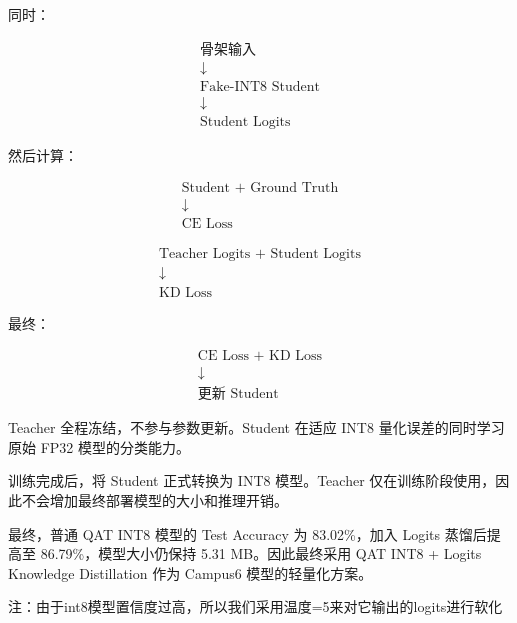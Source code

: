 同时：

\[
\begin{gathered}
\text{骨架输入}\\[-0.2em]
\downarrow\\[-0.2em]
\text{Fake-INT8 Student}\\[-0.2em]
\downarrow\\[-0.2em]
\text{Student Logits}
\end{gathered}
\]

然后计算：

\[
\begin{gathered}
\text{Student + Ground Truth}\\[-0.2em]
\downarrow\\[-0.2em]
\text{CE Loss}
\end{gathered}
\]

\[
\begin{gathered}
\text{Teacher Logits + Student Logits}\\[-0.2em]
\downarrow\\[-0.2em]
\text{KD Loss}
\end{gathered}
\]

最终：

\[
\begin{gathered}
\text{CE Loss + KD Loss}\\[-0.2em]
\downarrow\\[-0.2em]
\text{更新 Student}
\end{gathered}
\]

Teacher 全程冻结，不参与参数更新。Student 在适应 INT8 量化误差的同时学习原始 FP32 模型的分类能力。

训练完成后，将 Student 正式转换为 INT8 模型。Teacher 仅在训练阶段使用，因此不会增加最终部署模型的大小和推理开销。

最终，普通 QAT INT8 模型的 Test Accuracy 为 83.02\%，加入 Logits 蒸馏后提高至 86.79\%，模型大小仍保持 5.31 MB。因此最终采用 QAT INT8 + Logits Knowledge Distillation 作为 Campus6 模型的轻量化方案。

注：由于int8模型置信度过高，所以我们采用温度=5来对它输出的logits进行软化

